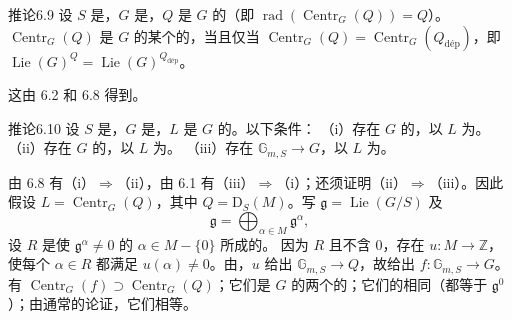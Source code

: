 \begin{SGAresult}{推论}{6.9}
设 $S$ 是，$G$ 是，$Q$ 是 $G$ 的（即 $\operatorname{rad}(\operatorname{Centr}_G(Q))=Q$）。$\operatorname{Centr}_G(Q)$ 是 $G$ 的某个的，当且仅当 $\operatorname{Centr}_G(Q)=\operatorname{Centr}_G(Q_{\mathrm{d\text{é}p}})$，即 $\operatorname{Lie}(G)^Q=\operatorname{Lie}(G)^{Q_{\mathrm{d\text{é}p}}}$。
\end{SGAresult}
这由 6.2 和 6.8 得到。
\begin{SGAresult}{推论}{6.10}
设 $S$ 是，$G$ 是，$L$ 是 $G$ 的。以下条件：
（i）存在 $G$ 的，以 $L$ 为。
（ii）存在 $G$ 的，以 $L$ 为。
（iii）存在 $\mathbb G_{m,S}\to G$，以 $L$ 为。
\end{SGAresult}
由 6.8 有（i）$\Rightarrow$（ii），由 6.1 有（iii）$\Rightarrow$（i）；还须证明（ii）$\Rightarrow$（iii）。因此假设 $L=\operatorname{Centr}_G(Q)$，其中 $Q=\mathrm D_S(M)$。写 $\mathfrak g=\operatorname{Lie}(G/S)$ 及
\[
 \mathfrak g=\bigoplus_{\alpha\in M}\mathfrak g^\alpha,
\]
设 $R$ 是使 $\mathfrak g^\alpha\neq0$ 的 $\alpha\in M-\{0\}$ 所成的。
因为 $R$ 且不含 $0$，存在 $u:M\to\mathbb Z$，使每个 $\alpha\in R$ 都满足 $u(\alpha)\neq0$。由，$u$ 给出 $\mathbb G_{m,S}\to Q$，故给出 $f:\mathbb G_{m,S}\to G$。有 $\operatorname{Centr}_G(f)\supset\operatorname{Centr}_G(Q)$；它们是 $G$ 的两个的；它们的相同（都等于 $\mathfrak g^0$）；由通常的论证，它们相等。

